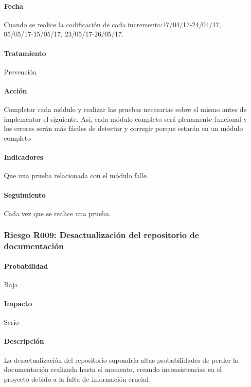 \documentclass[10pt,a4paper]{article}
\begin{document}
				\paragraph{Fecha} Cuando se realice la codificación de cada incremento:17/04/17-24/04/17, 05/05/17-15/05/17, 23/05/17-26/05/17. %
				\paragraph{Tratamiento} Prevención %
				\paragraph{Acción} Completar cada módulo y realizar las pruebas necesarias sobre el mismo antes de implementar el siguiente. Así, cada módulo completo será plenamente funcional y los errores serán más fáciles de detectar y corregir porque estarán en un módulo completo%
				\paragraph{Indicadores} Que una prueba relacionada con el módulo falle.  %
				\paragraph{Seguimiento}	Cada vez que se realice una prueba. %
								
			\subsubsection{Riesgo R009: Desactualización del repositorio de documentación}
				\paragraph{Probabilidad} Baja
				\paragraph{Impacto}	Serio
				\paragraph{Descripción} La desactualización del repositorio supondría altas probabilidades de perder la documentación realizada hasta el momento, creando inconsistencias en el proyecto debido a la falta de información crucial. 
\end{document}
